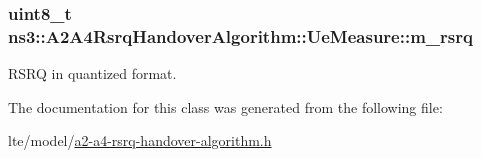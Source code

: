 \subsubsection[{\texorpdfstring{m\+\_\+rsrq}{m_rsrq}}]{\setlength{\rightskip}{0pt plus 5cm}uint8\+\_\+t ns3\+::\+A2\+A4\+Rsrq\+Handover\+Algorithm\+::\+Ue\+Measure\+::m\+\_\+rsrq}\hypertarget{classns3_1_1A2A4RsrqHandoverAlgorithm_1_1UeMeasure_a1b86db5f2cee0625eb3b98b1c22860d8}{}\label{classns3_1_1A2A4RsrqHandoverAlgorithm_1_1UeMeasure_a1b86db5f2cee0625eb3b98b1c22860d8}


R\+S\+RQ in quantized format. 



The documentation for this class was generated from the following file\+:\begin{DoxyCompactItemize}
\item 
lte/model/\hyperlink{a2-a4-rsrq-handover-algorithm_8h}{a2-\/a4-\/rsrq-\/handover-\/algorithm.\+h}\end{DoxyCompactItemize}
